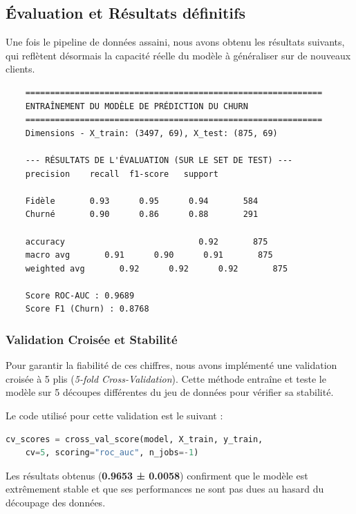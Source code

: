 \subsection{Évaluation et Résultats définitifs}
Une fois le pipeline de données assaini, nous avons obtenu les résultats suivants, qui reflètent désormais la capacité réelle du modèle à généraliser sur de nouveaux clients.

\begin{verbatim}
	============================================================
	ENTRAÎNEMENT DU MODÈLE DE PRÉDICTION DU CHURN
	============================================================
	Dimensions - X_train: (3497, 69), X_test: (875, 69)
	
	--- RÉSULTATS DE L'ÉVALUATION (SUR LE SET DE TEST) ---
	precision    recall  f1-score   support
	
	Fidèle       0.93      0.95      0.94       584
	Churné       0.90      0.86      0.88       291
	
	accuracy                           0.92       875
	macro avg       0.91      0.90      0.91       875
	weighted avg       0.92      0.92      0.92       875
	
	Score ROC-AUC : 0.9689
	Score F1 (Churn) : 0.8768
\end{verbatim}

\subsubsection{Validation Croisée et Stabilité}
Pour garantir la fiabilité de ces chiffres, nous avons implémenté une validation croisée à 5 plis (\textit{5-fold Cross-Validation}). Cette méthode entraîne et teste le modèle sur 5 découpes différentes du jeu de données pour vérifier sa stabilité.

Le code utilisé pour cette validation est le suivant :
\begin{lstlisting}[language=Python, caption=Implémentation de la validation croisée]
	cv_scores = cross_val_score(model, X_train, y_train, 
	cv=5, scoring="roc_auc", n_jobs=-1)
\end{lstlisting}

Les résultats obtenus (\textbf{0.9653 ± 0.0058}) confirment que le modèle est extrêmement stable et que ses performances ne sont pas dues au hasard du découpage des données.


